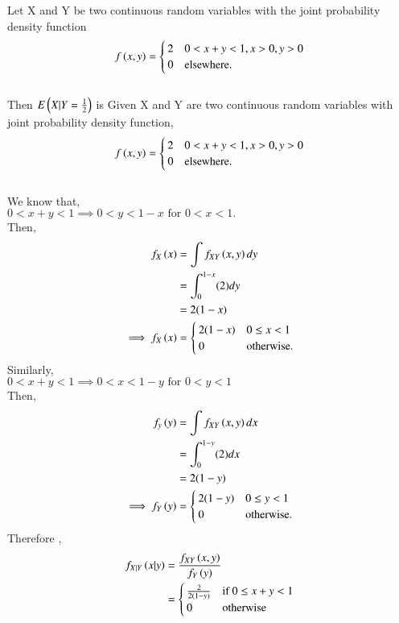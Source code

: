 Let X and Y be two continuous random variables with the joint probability density function 
\begin{align}
f\left(x,y\right)= 
\begin{cases}
2 & 0<x+y<1, x>0, y>0 \\
0 & \text{elsewhere}.
\end{cases}   
\end{align}
\\Then $E\left(X|Y=\frac{1}{2}\right)$ is 
%
Given X and Y are two continuous random variables with joint probability density function,
\begin{align}
f\left(x,y\right)= 
\begin{cases}
2 & 0<x+y<1, x>0, y>0 \\
0 & \text{elsewhere}.
\end{cases}    
\end{align}
\\We know that,\\
$0<x+y<1  \implies 0<y<1-x \text{ for } 0<x<1.$\\ 
Then,
\begin{align}
    f_X\left(x\right) &= \int f_{XY}\left(x,y\right)dy\\
    &= \int_{0}^{1-x} (2)dy\\
    &= 2(1-x)\\
\implies f_X\left(x\right) &=
    \begin{cases}
    2(1-x) & 0 \leq x <1\\
    0 & \text{otherwise}.
    \end{cases}
\end{align}
Similarly,\\
$ 0<x+y<1 \implies 0<x<1-y \text{ for } 0<y<1$ \\
Then,
\begin{align}
    f_y\left(y\right) &= \int f_{XY}\left(x,y\right)dx\\
    &= \int_{0}^{1-y} (2)dx\\
    &= 2(1-y)\\
\implies f_Y\left(y\right) &=
    \begin{cases}
    2(1-y) & 0 \leq y <1\\
    0 & \text{otherwise}.
    \end{cases}
\end{align}
Therefore ,
\begin{align}
    f_{X|Y}\left(x|y\right) &= \frac{f_{XY}\left(x,y\right)}{f_Y\left(y\right)}\\
    & = 
    \begin{cases}
    \frac{2}{2(1-y)} & \text{if } 0\leq x+y < 1\\
    0 & \text{otherwise}
    \end{cases}
\end{align}
